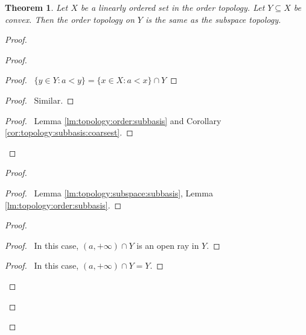 \documentclass{report}
\newtheorem{thm}[lm]{Theorem}
\theoremstyle{definition}
\begin{document}
  \begin{thm}
    Let $X$ be a linearly ordered set in the order topology. Let $Y \subseteq
    X$
    be convex. Then the order topology on $Y$ is the same as the subspace
    topology.
  \end{thm}

  \begin{proof}
    \pf
    \begin{proof}
      \begin{proof}
        \pf\ $\{ y \in Y : a < y \} = \{ x \in X : a < x \} \cap Y$
      \end{proof}
      \begin{proof}
        \pf\ Similar.
      \end{proof}
      \qedstep
      \begin{proof}
        \pf\ Lemma \ref{lm:topology:order:subbasis} and Corollary
        \ref{cor:topology:subbasis:coarsest}.
      \end{proof}
    \end{proof}
    \begin{proof}
      \begin{proof}
        \pf\ Lemma \ref{lm:topology:subspace:subbasis}, Lemma
        \ref{lm:topology:order:subbasis}.
      \end{proof}
      \begin{proof}
        \begin{proof}
          \pf\ In this case, $(a, +\infty) \cap Y$ is an open ray in $Y$.
        \end{proof}
        \begin{proof}
          \pf\ In this case, $(a, +\infty) \cap Y = Y$.
        \end{proof}

\end{proof}
\end{proof}
\end{proof}
\end{document}
